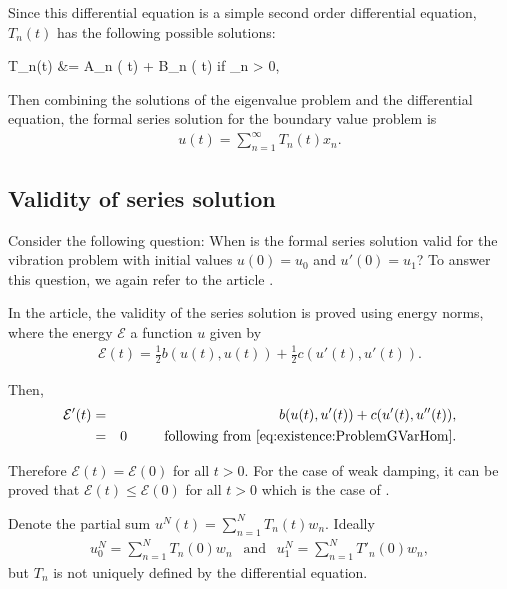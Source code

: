 		Since this differential equation is a simple second order differential equation, $T_n(t)$ has the following possible solutions:
		\begin{flalign}
			T_n(t) &=  A_n \cos( t) + B_n \sin( t) \quad \textrm{ if } \lambda_n > 0, \label{lambda_1}
		\end{flalign}

		Then combining the solutions of the eigenvalue problem and the differential equation, the formal series solution for the boundary value problem is
		\begin{eqnarray}
			u(t) = \sum_{n=1}^{\infty} T_n(t)x_n. \label{eq:1D_Model:ModalAnalysisSeriesSolution}
		\end{eqnarray}


	\subsection*{Validity of series solution}
		Consider the following question: When is the formal series solution valid for the vibration problem with initial values $u(0) = u_0$ and $u'(0) = u_1$? To answer this question, we again refer to the article \cite{CVV18}.

		In the article, the validity of the series solution is proved using energy norms, where the energy $\mathcal{E}$ a function $u$ given by \label{sym:Energy}
		\begin{eqnarray}
			\mathcal{E} (t) = \frac{1}{2} b(u(t), u(t)) + \frac{1}{2} c(u'(t), u'(t)). \label{eq:1D_Model:ModalAnalysisEnergy}
		\end{eqnarray}

		Then,
		\begin{eqnarray*}
			\mathcal{E}'(t) & = & b(u(t), u'(t)) + c(u'(t), u''(t)),\\
							& = & 0 \ \ \ \ \ \ \ \textrm{ following from \eqref{eq:existence:ProblemGVarHom}}. 
		\end{eqnarray*}

		Therefore $\mathcal{E}(t) = \mathcal{E}(0)$ for all $t>0$. For the case of weak damping, it can be proved that $\mathcal{E}(t) \leq \mathcal{E}(0)$ for all $t>0$ which is the case of \cite{CVV18}.

		Denote the partial sum $u^{N}(t) = \sum_{n=1}^{N} T_{n}(t)w_n$. Ideally
		\begin{eqnarray*}
			u_0^{N} = \sum_{n=1}^{N} T_n(0) w_n \ \ \textrm{ and } \ \ u_{1}^{N} =\sum_{n=1}^{N} T'_n(0) w_n,
		\end{eqnarray*}
		but $T_n$ is not uniquely defined by the differential equation.


